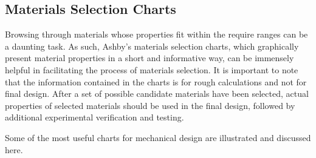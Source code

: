 \documentclass[a4paper,openany,12pt]{book}
\begin{document}
\subsection{Materials Selection Charts}
\label{materials-selection-charts}
Browsing through materials whose properties fit within the require
ranges can be a daunting task. As such, Ashby's materials selection
charts, which graphically present material properties in a short and
informative way, can be immensely helpful in facilitating the process of
materials selection. It is important to note that the information
contained in the charts is for rough calculations and not for final
design. After a set of possible candidate materials have been selected,
actual properties of selected materials should be used in the final
design, followed by additional experimental verification and testing.

Some of the most useful charts for mechanical design are illustrated and
discussed here.
\end{document}
